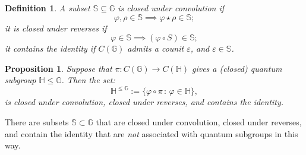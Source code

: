 \documentclass[12pt]{amsart}
\newtheorem{definition}[theorem]{Definition}
\newtheorem{proposition}[theorem]{Proposition}
\theoremstyle{remark}
\theoremstyle{remark}
\begin{document}
\begin{definition}
A subset $\mathbb{S}\subseteq \mathbb{G}$ is \emph{closed under convolution} if
$$\varphi,\rho\in \mathbb{S}\implies \varphi\star\rho\in\mathbb{S};$$
it is \emph{closed under reverses} if
$$\varphi\in\mathbb{S}\implies (\varphi\circ S)\in\mathbb{S};$$
it \emph{contains the identity} if $C(\mathbb{G})$ admits a counit $\varepsilon$, and $\varepsilon\in\mathbb{S}$.
\end{definition}
\begin{proposition}
Suppose that $\pi:C(\mathbb{G})\to C(\mathbb{H})$ gives a (closed) quantum subgroup $\mathbb{H}\leq \mathbb{G}$. Then the set:
$$\mathbb{H}^{\leq \mathbb{G}}:=\{\varphi\circ \pi\,\colon\,\varphi\in \mathbb{H}\},$$
is closed under convolution, closed under reverses, and contains the identity.
\end{proposition}

There are subsets $\mathbb{S}\subset \mathbb{G}$ that are closed under convolution, closed under reverses, and contain the identity that are \emph{not} associated with quantum subgroups in this way.
\end{document}
